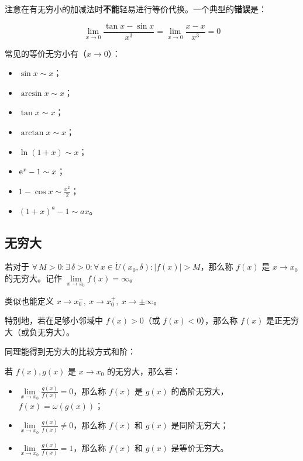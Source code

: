 注意在有无穷小的加减法时\textbf{不能}轻易进行等价代换。一个典型的\textbf{错误}是：

$$
\lim_{x \to 0} \frac{\tan x - \sin x}{x^3} = \lim_{x \to 0} \frac{x - x}{x^3} = 0
$$

常见的等价无穷小有（$x \to 0$）：

\begin{itemize}
	\item $\sin x \sim x$；
	\item $\arcsin x \sim x$；
	\item $\tan x \sim x$；
	\item $\arctan x \sim x$；
	\item $\ln(1 + x) \sim x$；
	\item $\mathrm{e}^x - 1 \sim x$；
	\item $1 - \cos x \sim \frac{x^2}{2}$；
	\item $(1 + x)^a - 1 \sim ax$。
\end{itemize}

\subsection{无穷大}

\begin{definition}
	若对于 $\forall\,M > 0: \exists\,\delta > 0: \forall\,x \in \mathring{U}(x_0, \delta): |f(x)| > M$，那么称 $f(x)$ 是 $x \to x_0$ 的无穷大。记作 $\lim\limits_{x \to x_0} f(x) = \infty$。

	类似也能定义 $x \to x_0^-,\ x \to x_0^+,\ x \to \pm \infty$。

	特别地，若在足够小邻域中 $f(x) > 0$（或 $f(x) < 0$），那么称 $f(x)$ 是正无穷大（或负无穷大）。
\end{definition}

同理能得到无穷大的比较方式和阶：

\begin{definition}[无穷大的比较]
	若 $f(x),g(x)$ 是 $x \to x_0$ 的无穷大，那么若：
	\begin{itemize}
		\item $\lim\limits_{x \to x_0} \frac{g(x)}{f(x)} = 0$，那么称 $f(x)$ 是 $g(x)$ 的高阶无穷大，$f(x) = \omega(g(x))$；
		\item $\lim\limits_{x \to x_0} \frac{g(x)}{f(x)} \neq 0$，那么称 $f(x)$ 和 $g(x)$ 是同阶无穷大；
		\item $\lim\limits_{x \to x_0} \frac{g(x)}{f(x)} = 1$，那么称 $f(x)$ 和 $g(x)$ 是等价无穷大。
	\end{itemize}
\end{definition}


